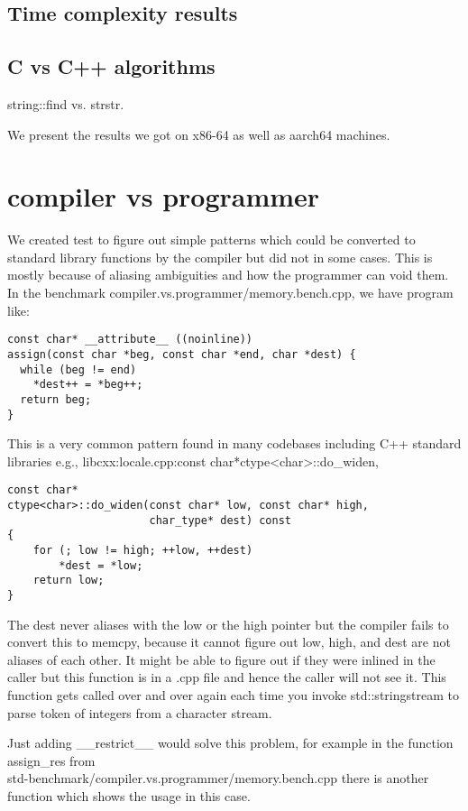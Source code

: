 \documentclass{sig-alternate}
\begin{document}
\subsection{Time complexity results}

\subsection{C vs C++ algorithms}
string::find vs. strstr.

We present the results we got on x86-64 as well as aarch64 machines.

\section{compiler vs programmer}
We created test to figure out simple patterns which could be converted to
standard library functions by the compiler but did not in some cases. This is
mostly because of aliasing ambiguities and how the programmer can void them.  In
the benchmark compiler.vs.programmer/memory.bench.cpp, we have program like:

\begin{verbatim}
const char* __attribute__ ((noinline))
assign(const char *beg, const char *end, char *dest) {
  while (beg != end)
    *dest++ = *beg++;
  return beg;
}
\end{verbatim}

This is a very common pattern found in many codebases including C++ standard
libraries e.g., libcxx:locale.cpp:const char*ctype<char>::do\_widen,

\begin{verbatim}
const char*
ctype<char>::do_widen(const char* low, const char* high,
                      char_type* dest) const
{
    for (; low != high; ++low, ++dest)
        *dest = *low;
    return low;
}
\end{verbatim}

The dest never aliases with the low or the high pointer but the compiler fails
to convert this to memcpy, because it cannot figure out low, high, and dest are
not aliases of each other.  It might be able to figure out if they were inlined
in the caller but this function is in a .cpp file and hence the caller will not
see it. This function gets called over and over again each time you invoke
std::stringstream to parse token of integers from a character stream.

Just adding \_\_restrict\_\_ would solve this problem, for example in the
function assign\_res
from\\ std-benchmark/compiler.vs.programmer/memory.bench.cpp there is another
function which shows the usage in this case.
\end{document}
